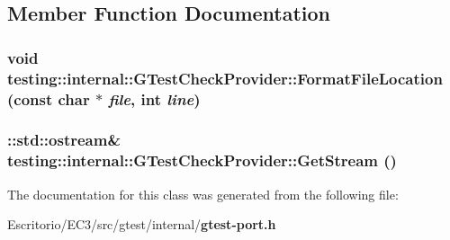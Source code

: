 \subsection{Member Function Documentation}
\subsubsection{\setlength{\rightskip}{0pt plus 5cm}void testing::internal::GTestCheckProvider::FormatFileLocation (const char $\ast$ {\em file}, int {\em line})\hspace{0.3cm}{\tt  [inline]}}\label{classtesting_1_1internal_1_1GTestCheckProvider_b1912d78c8661bd0614185c6627f415a}


\subsubsection{\setlength{\rightskip}{0pt plus 5cm}::std::ostream\& testing::internal::GTestCheckProvider::GetStream ()\hspace{0.3cm}{\tt  [inline]}}\label{classtesting_1_1internal_1_1GTestCheckProvider_792d59eb02feb707ec9ea8d55e3394ef}




The documentation for this class was generated from the following file:\begin{CompactItemize}
\item 
Escritorio/EC3/src/gtest/internal/{\bf gtest-port.h}\end{CompactItemize}
